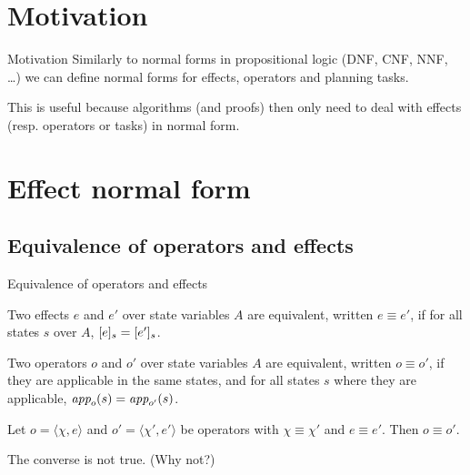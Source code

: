 \documentclass{gkibeamer}
\begin{document}
\subtitle{Normal forms}
\date{November 4th, 2011}
\maketitles


\section*{Motivation}
\begin{frame}{Motivation}
  Similarly to normal forms in propositional logic (DNF, CNF, NNF,
  \dots) we can define \alert{normal forms for effects, operators 
  and planning tasks}.
  \bigskip

  This is useful because algorithms (and proofs) then only need to deal
  with effects (resp. operators or tasks) in normal form.
\end{frame}

\section[Effect normal form]{Effect normal form}
\subsection[Equivalences]{Equivalence of operators and effects}

\begin{frame}{Equivalence of operators and effects}
  \begin{definition}
    Two effects $e$ and $e'$ over state variables $A$ are
    \alert{equivalent}, written \alert{$e \equiv e'$}, if
    for all states $s$ over $A$, $\lbrack e\rbrack_{s} = \lbrack e'\rbrack_{s}$.
  \end{definition}

  \begin{definition}
    Two operators $o$ and $o'$ over state variables $A$ are
    \alert{equivalent}, written \alert{$o \equiv o'$}, if
    they are applicable in the same states, and for all states
    $s$ where they are applicable, $\textit{app}_{o}(s) = \textit{app}_{o'}(s)$.
  \end{definition}

  \begin{theorem}
    Let $o = \langle \chi, e\rangle$ and $o' = \langle \chi', e'\rangle$ be
    operators with $\chi \equiv \chi'$ and $e \equiv e'$. Then
    $o \equiv o'$.
  \end{theorem}
   The converse is not true. (Why not?)
\end{frame}
\end{document}
